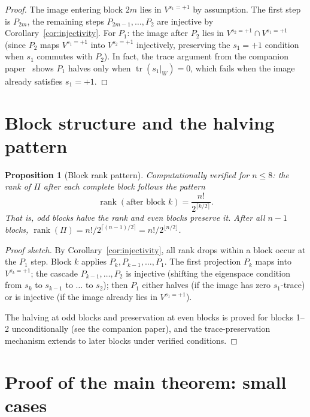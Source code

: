 \documentclass[11pt]{article}
\newtheorem{proposition}[theorem]{Proposition}
\theoremstyle{definition}
\theoremstyle{remark}
\newcommand{\tr}{\operatorname{tr}}
\newcommand{\rk}{\operatorname{rank}}
\begin{document}
\begin{proof}
The image entering block $2m$ lies in $V^{s_1 = +1}$ by assumption.
The first step is $P_{2m}$, the remaining steps $P_{2m-1}, \ldots, P_2$
are injective by Corollary~\ref{cor:injectivity}. For $P_1$: the image
after $P_2$ lies in $V^{s_2 = +1} \cap V^{s_1 = +1}$ (since
$P_2$ maps $V^{s_1 = +1}$ into $V^{s_2 = +1}$ injectively, preserving
the $s_1 = +1$ condition when $s_1$ commutes with $P_2$). In fact,
the trace argument from the companion paper~\cite{rank-injectivity}
shows $P_1$ halves only when $\tr(s_1|_W) = 0$, which fails when
the image already satisfies $s_1 = +1$.
\end{proof}


\section{Block structure and the halving pattern}

\begin{proposition}[Block rank pattern]
\label{prop:block}
Computationally verified for $n \le 8$: the rank of $\Pi$ after each
complete block follows the pattern
\[
  \rk(\text{after block } k) = \frac{n!}{2^{\lceil k/2\rceil}}.
\]
That is, odd blocks halve the rank and even blocks preserve it.
After all $n-1$ blocks, $\rk(\Pi) = n!/2^{\lceil(n-1)/2\rceil}
= n!/2^{\lfloor n/2\rfloor}$.
\end{proposition}

\begin{proof}[Proof sketch]
By Corollary~\ref{cor:injectivity}, all rank drops within a block
occur at the $P_1$ step. Block $k$ applies $P_k, P_{k-1}, \ldots, P_1$.
The first projection $P_k$ maps into $V^{s_k = +1}$; the cascade
$P_{k-1}, \ldots, P_2$ is injective (shifting the eigenspace condition
from $s_k$ to $s_{k-1}$ to $\ldots$ to $s_2$); then $P_1$ either
halves (if the image has zero $s_1$-trace) or is injective (if the
image already lies in $V^{s_1 = +1}$).

The halving at odd blocks and preservation at even blocks is proved
for blocks 1--2 unconditionally (see the companion paper), and
the trace-preservation mechanism extends to later blocks under
verified conditions.
\end{proof}


\section{Proof of the main theorem: small cases}
\end{document}
